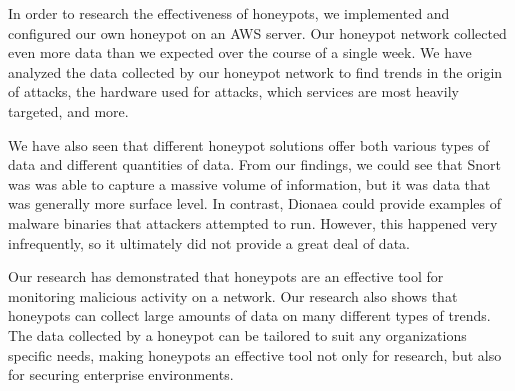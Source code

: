 In order to research the effectiveness of honeypots, we implemented and configured our own honeypot on an AWS server. Our honeypot network collected even more data than we expected over the course of a single week. We have analyzed the data collected by our honeypot network to find trends in the origin of attacks, the hardware used for attacks, which services are most heavily targeted, and more. 

We have also seen that different honeypot solutions offer both various types of data and different quantities of data. From our findings, we could see that Snort was was able to capture a massive volume of information, but it was data that was generally more surface level. In contrast, Dionaea could provide examples of malware binaries that attackers attempted to run. However, this happened very infrequently, so it ultimately did not provide a great deal of data.

Our research has demonstrated that honeypots are an effective tool for monitoring malicious activity on a network. Our research also shows that honeypots can collect large amounts of data on many different types of trends. The data collected by a honeypot can be tailored to suit any organizations specific needs, making honeypots an effective tool not only for research, but also for securing enterprise environments. 